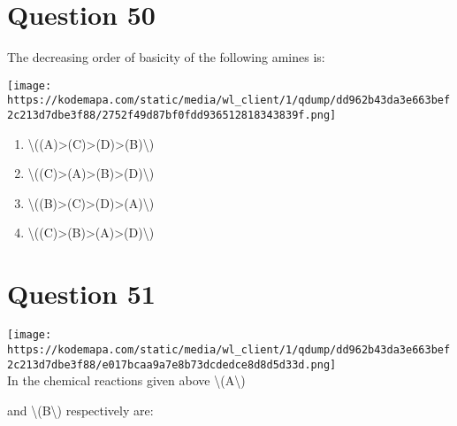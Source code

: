 \documentclass{article}
\begin{document}
\section*{Question 50}
The decreasing order of basicity of the following amines is:



\texttt{[image: https://kodemapa.com/static/media/wl\_client/1/qdump/dd962b43da3e663bef2c213d7dbe3f88/2752f49d87bf0fdd936512818343839f.png]}\\


\begin{enumerate}[label=(\alph*)]
\item \textbackslash((A)\textgreater(C)\textgreater(D)\textgreater(B)\textbackslash)


\item \textbackslash((C)\textgreater(A)\textgreater(B)\textgreater(D)\textbackslash)


\item \textbackslash((B)\textgreater(C)\textgreater(D)\textgreater(A)\textbackslash)


\item \textbackslash((C)\textgreater(B)\textgreater(A)\textgreater(D)\textbackslash)


\end{enumerate}
\newpage
\section*{Question 51}
\texttt{[image: https://kodemapa.com/static/media/wl\_client/1/qdump/dd962b43da3e663bef2c213d7dbe3f88/e017bcaa9a7e8b73dcdedce8d8d5d33d.png]}\\



In the chemical reactions given above \textbackslash(A\textbackslash)

and \textbackslash(B\textbackslash) respectively are:
\end{document}
